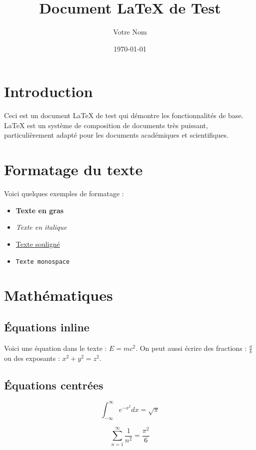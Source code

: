 \documentclass[12pt,a4paper]{article}
\title{Document LaTeX de Test}
\author{Votre Nom}
\date{\today}
\begin{document}
\maketitle

\tableofcontents
\newpage

\section{Introduction}

Ceci est un document LaTeX de test qui démontre les fonctionnalités de base. LaTeX est un système de composition de documents très puissant, particulièrement adapté pour les documents académiques et scientifiques.

\section{Formatage du texte}

Voici quelques exemples de formatage :
\begin{itemize}
    \item \textbf{Texte en gras}
    \item \textit{Texte en italique}
    \item \underline{Texte souligné}
    \item \texttt{Texte monospace}
\end{itemize}

\section{Mathématiques}

\subsection{Équations inline}

Voici une équation dans le texte : $E = mc^2$. On peut aussi écrire des fractions : $\frac{a}{b}$ ou des exposants : $x^2 + y^2 = z^2$.

\subsection{Équations centrées}

\begin{equation}
\int_{-\infty}^{\infty} e^{-x^2} dx = \sqrt{\pi}
\end{equation}

\begin{equation}
\sum_{n=1}^{\infty} \frac{1}{n^2} = \frac{\pi^2}{6}
\end{equation}
\end{document}
